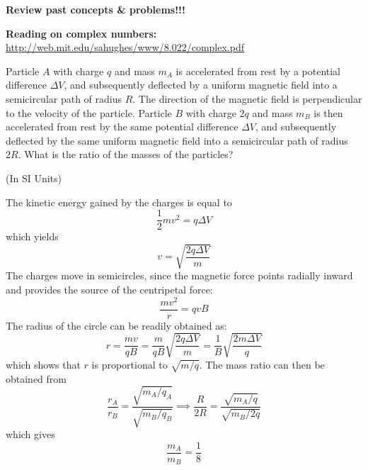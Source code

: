 \documentclass[makesolutionspdf]{esg8022pset}
\begin{document}
\begin{ForPSet}
  \noindent \textbf{Review past concepts \& problems!!!}

  \noindent \textbf{Reading on complex numbers:} \url{http://web.mit.edu/sahughes/www/8.022/complex.pdf}
\end{ForPSet}

\begin{problem}{}
  Particle $A$ with charge $q$ and mass $m_A$ is accelerated from rest by a potential difference $\Delta V$, and subsequently deflected by a uniform magnetic field into a semicircular path of radius $R$.  The direction of the magnetic field is perpendicular to the velocity of the particle.  Particle $B$ with charge $2q$ and mass $m_B$ is then accelerated from rest by the same potential difference $\Delta V$, and subsequently deflected by the same uniform magnetic field into a semicircular path of radius $2R$.  What is the ratio of the masses of the particles?
\end{problem}
\begin{solution}
  (In SI Units)

  The kinetic energy gained by the charges is equal to 
  $$\frac12 mv^2 = q\Delta V$$
  which yields
  $$v = \sqrt{\frac{2q \Delta V}{m}}$$
  The charges move in semicircles, since the magnetic force points radially inward and provides the source of the centripetal force:
  $$\frac{mv^2}{r} = qvB$$
  The radius of the circle can be readily obtained as:
  $$r = \frac{mv}{qB} = \frac{m}{qB}\sqrt{\frac{2q\Delta V}{m}} = \frac{1}{B}\sqrt{\frac{2m\Delta V}{q}}$$
  which shows that $r$ is proportional to $\sqrt{m/q}$. The mass ratio can then be obtained from
  $$\frac{r_A}{r_B} = \frac{\sqrt{m_A / q_A}}{\sqrt{m_B / q_B}} \implies \frac{R}{2R} = \frac{\sqrt{m_A / q}}{\sqrt{m_B / 2q}}$$
  which gives
  $$\frac{m_A}{m_B} = \frac18$$
\end{solution}
\end{document}
